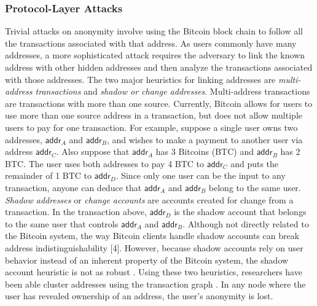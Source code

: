 \subsubsection{Protocol-Layer Attacks}
Trivial attacks on anonymity involve using the Bitcoin block chain to follow all the transactions associated with that address. As users commonly have many addresses, a more sophisticated attack requires the adversary to link the known address with other hidden addresses and then analyze the transactions associated with those addresses. The two major heuristics for linking addresses are \emph{multi-address transactions} and \emph{shadow or change addresses}. Multi-address transactions are transactions with more than one source. Currently, Bitcoin allows for users to use more than one source address in a transaction, but does not allow multiple users to pay for one transaction. For example, suppose a single user owns two addresses, $\mathsf{addr}_A$ and $\mathsf{addr}_B$, and wishes to make a payment to another user via address $\mathsf{addr}_C$. Also suppose that $\mathsf{addr}_A$ has 3 Bitcoins (BTC) and $\mathsf{addr}_B$ has 2 BTC. The user uses both addresses to pay 4 BTC to $\mathsf{addr}_C$ and puts the remainder of 1 BTC to $\mathsf{addr}_D$. Since only one user can be the input to any transaction, anyone can deduce that $\mathsf{addr}_A$ and $\mathsf{addr}_B$ belong to the same user. \emph{Shadow addresses} or \emph{change accounts} are accounts created for change from a transaction. In the transaction above, $\mathsf{addr}_D$ is the shadow account that belongs to the same user that controls $\mathsf{addr}_A$ and $\mathsf{addr}_B$. Although not directly related to the Bitcoin system, the way Bitcoin clients handle shadow accounts can break address indistinguishability [4]. However, because shadow accounts rely on user behavior instead of an inherent property of the Bitcoin system, the shadow account heuristic is not as robust \cite{Fistful12}. Using these two heuristics, researchers have been able cluster addresses using the transaction graph \cite{Shamir13-bitcoingraph,ReidHarrigan13,Fistful12}. In any node where the user has revealed ownership of an address, the user's anonymity is lost.

